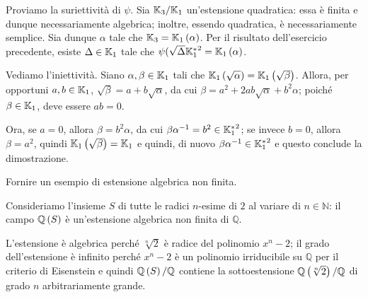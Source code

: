 \Solution Proviamo la suriettivit\`a di $\psi$. Sia $\mathbb{K}_3/\mathbb{K}_1$ un'estensione quadratica: essa \`e finita e dunque necessariamente algebrica; inoltre, essendo quadratica, \`e necessariamente semplice. Sia dunque $\alpha$ tale che $\mathbb{K}_3 = \mathbb{K}_1 \left ( \alpha \right )$. Per il risultato dell'esercicio precedente, esiste $\Delta \in \mathbb{K}_1$ tale che $\psi(\sqrt{\Delta}{\mathbb{K}_1^*}^2 = \mathbb{K}_1 \left ( \alpha \right )$.
\par Vediamo l'iniettivit\`a. Siano $\alpha, \beta \in \mathbb{K}_1$ tali che $\mathbb{K}_1 \left ( \sqrt{\alpha} \right ) = \mathbb{K}_1 \left ( \sqrt{\beta} \right )$. Allora, per opportuni $a, b \in \mathbb{K}_1$, $\sqrt{\beta} = a + b \sqrt{\alpha}$, da cui $\beta = a^2 + 2ab\sqrt{\alpha} + b^2\alpha$; poich\'e $\beta \in \mathbb{K}_1$, deve essere $ab = 0$.
\par Ora, se $a = 0$, allora $\beta = b^2\alpha$, da cui $\beta\alpha^{-1} = b^2 \in {\mathbb{K}_1^*}^2$; se invece $b = 0$, allora $\beta = a^2$, quindi $\mathbb{K}_1 \left ( \sqrt{\beta} \right ) = \mathbb{K}_1$ e quindi, di nuovo $\beta\alpha^{-1} \in {\mathbb{K}_1^*}^2$ e questo conclude la dimostrazione. \EndSolution
\begin{Exercice}
	Fornire un esempio di estensione algebrica non finita.
\end{Exercice}
\Solution Consideriamo l'insieme $S$ di tutte le radici $n$-esime di $2$ al variare di $n \in \mathbb{N}$: il campo $\mathbb{Q} \left ( S \right )$ \`e un'estensione algebrica non finita di $\mathbb{Q}$.
\par L'estensione \`e algebrica perch\'e $\sqrt[n]{2}$ \`e radice del polinomio $x^n - 2$; il grado dell'estensione \`e infinito perch\'e $x^n - 2$ \`e un polinomio irriducibile su $\mathbb{Q}$ per il criterio di Eisenstein e quindi $\mathbb{Q} \left ( S \right )/\mathbb{Q}$ contiene la sottoestensione $\mathbb{Q} \left ( \sqrt[n]{2} \right )/\mathbb{Q}$ di grado $n$ arbitrariamente grande. \EndSolution
